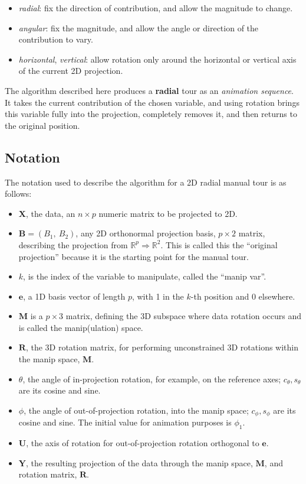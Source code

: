 \begin{itemize}
\tightlist
\item
  \emph{radial}: fix the direction of contribution, and allow the
  magnitude to change.
\item
  \emph{angular}: fix the magnitude, and allow the angle or direction of
  the contribution to vary.
\item
  \emph{horizontal}, \emph{vertical}: allow rotation only around the
  horizontal or vertical axis of the current 2D projection.
\end{itemize}

The algorithm described here produces a \textbf{radial} tour as an
\emph{animation sequence}. It takes the current contribution of the
chosen variable, and using rotation brings this variable fully into the
projection, completely removes it, and then returns to the original
position.

\hypertarget{notation}{%
\subsection{Notation}\label{notation}}

The notation used to describe the algorithm for a 2D radial manual tour
is as follows:

\begin{itemize}
\item
  \(\textbf{X}\), the data, an \(n \times p\) numeric matrix to be
  projected to 2D.
\item
  \(\textbf{B} = (B_1,~ B_2)\), any 2D orthonormal projection basis,
  \(p \times 2\) matrix, describing the projection from
  \(\mathbb{R}^p \Rightarrow \mathbb{R}^2\). This is called this the
  ``original projection'' because it is the starting point for the
  manual tour.
\item
  \(k\), is the index of the variable to manipulate, called the ``manip
  var''.
\item
  \(\textbf{e}\), a 1D basis vector of length \(p\), with 1 in the
  \(k\)-th position and 0 elsewhere.
\item
  \(\textbf{M}\) is a \(p \times 3\) matrix, defining the 3D subspace
  where data rotation occurs and is called the manip(ulation) space.
\item
  \(\textbf{R}\), the 3D rotation matrix, for performing unconstrained
  3D rotations within the manip space, \(\textbf{M}\).
\item
  \(\theta\), the angle of in-projection rotation, for example, on the
  reference axes; \(c_\theta, s_\theta\) are its cosine and sine.
\item
  \(\phi\), the angle of out-of-projection rotation, into the manip
  space; \(c_\phi, s_\phi\) are its cosine and sine. The initial value
  for animation purposes is \(\phi_1\).
\item
  \(\textbf{U}\), the axis of rotation for out-of-projection rotation
  orthogonal to \(\textbf{e}\).
\item
  \(\textbf{Y}\), the resulting projection of the data through the manip
  space, \(\textbf{M}\), and rotation matrix, \(\textbf{R}\).
\end{itemize}

